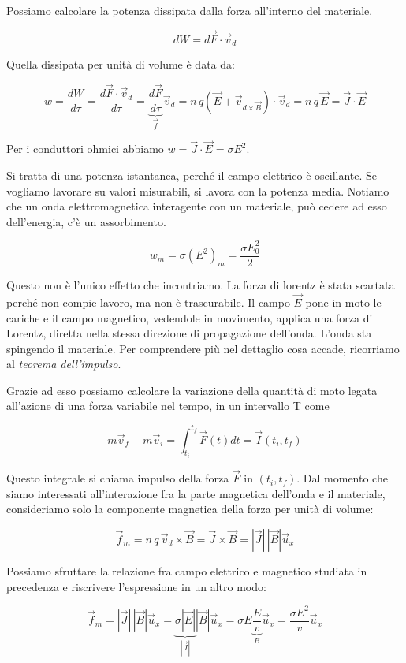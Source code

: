 Possiamo calcolare la potenza dissipata dalla forza all'interno del materiale.

\[
	dW=d\vec{F} \cdot \vec{v}_d
\]

Quella dissipata per unità di volume è data da:

\[
	w=\frac{dW}{d\tau}=\frac{d\vec{F} \cdot \vec{v}_d}{d\tau} = \underbrace{\frac{d\vec{F}}{d\tau}}_{\vec{f}}   \vec{v}_d  = n\,q(\vec{E} +\vec{v}_{d\times \vec{B}}  )\cdot \vec{v}_d = n\,q\,\vec{E} =\vec{J} \cdot \vec{E}
\]

Per i conduttori ohmici abbiamo $w = \vec{J} \cdot \vec{E} =\sigma E^2$.

Si tratta di una potenza istantanea, perché il campo elettrico è oscillante. Se vogliamo lavorare su valori misurabili, si lavora con la potenza media. Notiamo che un onda elettromagnetica interagente con un materiale, può cedere ad esso dell'energia, c'è un assorbimento.

\[
	w_m=\sigma (E^2)_m=\frac{\sigma E_0^2}{2}
\]

Questo non è l'unico effetto che incontriamo. La forza di lorentz è stata scartata perché non compie lavoro, ma non è trascurabile. Il campo $\vec{E}$ pone in moto le cariche e il campo magnetico, vedendole in movimento, applica una forza di Lorentz, diretta nella stessa direzione di propagazione dell'onda. L'onda sta spingendo il materiale. Per comprendere più nel dettaglio cosa accade, ricorriamo al \emph{teorema dell'impulso}.

Grazie ad esso possiamo calcolare la variazione della quantità di moto legata all'azione di una forza variabile nel tempo, in un intervallo T come

\[
	m\vec{v}_f - m\vec{v}_i=\int_{t_i}^{t_f} \vec{F} (t)dt = \vec{I} (t_i,t_f  )
\]

Questo integrale si chiama impulso della forza $\vec{F}$ in $(t_i, t_f)$. Dal momento che siamo interessati all'interazione fra la parte magnetica dell'onda e il materiale, consideriamo solo la componente magnetica della forza per unità di volume:

\[
	\vec{f}_m = n\,q\,\vec{v}_d\times \vec{B} = \vec{J} \times \vec{B} = |\vec{J}|\,|\vec{B}|\vec{u}_x
\]

Possiamo sfruttare la relazione fra campo elettrico e magnetico studiata in precedenza e riscrivere l'espressione in un altro modo:

\[
	\vec{f}_m = |\vec{J}|\,|\vec{B}|\vec{u}_x = \underbrace{\sigma |\vec{E} |}_{|\vec{J}|} |\vec{B} |\vec{u}_x = \sigma E \underbrace{\frac{E}{v}}_B \vec{u}_x = \frac{\sigma E^2}{v}\vec{u}_x
\]

